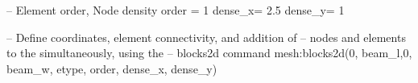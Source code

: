 -- Element order, Node density
order  =  1
dense_x=  2.5
dense_y=  1

-- Define coordinates, element connectivity, and addition of
-- nodes and elements to the simultaneously, using the
-- blocks2d command
mesh:blocks2d({0, beam_l},{0, beam_w}, etype, order, dense_x, dense_y)
